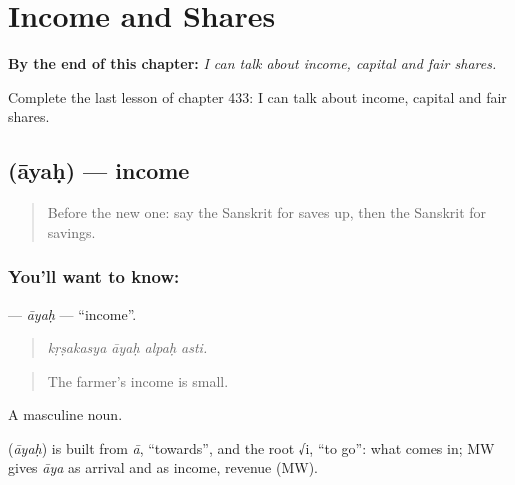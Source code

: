 
\chapter{Income and Shares}
\label{ch:sa-income-and-shares}

\begin{chapteropening}
\textbf{By the end of this chapter:} \emph{I can talk about income, capital and fair shares.}

Complete the last lesson of chapter 433: I can talk about income, capital and fair shares.
\end{chapteropening}

\section[\texorpdfstring{\sk{आयः} (āyaḥ)}{आयः (āyaḥ)}]{ (āyaḥ) — income}

\label{lesson:SA-C433-ayah}



\begin{quote}
Before the new one: say the Sanskrit for saves up, then the Sanskrit for savings.
\end{quote}

\subsection*{You'll want to know: }
\textbf{} — \emph{āyaḥ} — \textquotedblleft{}income\textquotedblright{}.

\begin{quote}
   
\end{quote}

\begin{quote}
\emph{kṛṣakasya āyaḥ alpaḥ asti.}
\end{quote}

\begin{quote}
The farmer's income is small.
\end{quote}

A masculine noun.

\begin{cousinweb}
\textbf{} (\emph{āyaḥ}) is built from \emph{ā}, \textquotedblleft{}towards\textquotedblright{}, and the root √i, \textquotedblleft{}to go\textquotedblright{}: what comes in; MW gives \emph{āya} as arrival and as income, revenue (MW).
\end{cousinweb}

